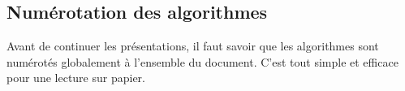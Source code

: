 \documentclass[12pt,a4paper]{article}
\begin{document}

\subsection{Numérotation des algorithmes}


Avant de continuer les présentations, il faut savoir que les algorithmes sont numérotés globalement à l'ensemble du document. C'est tout simple et efficace pour une lecture sur papier.
\end{document}
